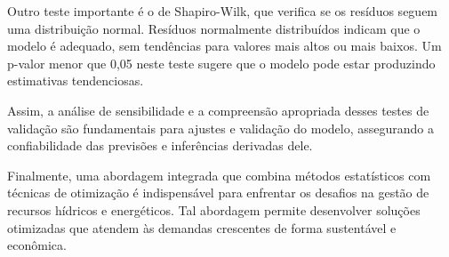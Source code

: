 Outro teste importante é o de Shapiro-Wilk, que verifica se os resíduos seguem uma distribuição normal. Resíduos normalmente distribuídos indicam que o modelo é adequado, sem tendências para valores mais altos ou mais baixos. Um p-valor menor que 0,05 neste teste sugere que o modelo pode estar produzindo estimativas tendenciosas.

Assim, a análise de sensibilidade e a compreensão apropriada desses testes de validação são fundamentais para ajustes e validação do modelo, assegurando a confiabilidade das previsões e inferências derivadas dele.

Finalmente, uma abordagem integrada que combina métodos estatísticos com técnicas de otimização é indispensável para enfrentar os desafios na gestão de recursos hídricos e energéticos. Tal abordagem permite desenvolver soluções otimizadas que atendem às demandas crescentes de forma sustentável e econômica.

